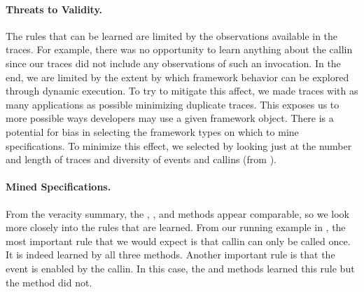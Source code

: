 \documentclass[10pt,reprint,nocopyrightspace,numbers]{sigplanconf}
\begin{document}
\paragraph{Threats to Validity.}

The rules that can be learned are limited by the observations available in the traces. For example, there was no opportunity to learn anything about the  callin since our traces did not include any observations of such an invocation. In the end, we are limited by the extent by which framework behavior can be explored through dynamic execution. To try to mitigate this affect, we made traces with as many applications as possible minimizing duplicate traces.  This exposes us to more possible ways developers may use a given framework object.
%
There is a potential for bias in selecting the framework types on which to mine specifications.
To minimize this effect, we selected by looking just at the number and length of traces and diversity of events and callins (from ).

\paragraph{Mined Specifications.}

From the veracity summary, the , \pfsa, and \hmm methods appear comparable, so we look more closely into the rules that are learned.
%
From our running example in , the most important rule that we would expect is
that  callin can only be called once.
It is indeed learned by all three methods.
Another important rule is that the  event is enabled by the  callin.
In this case, the  and \hmm methods learned this rule but the \pfsa method did not.
\end{document}

